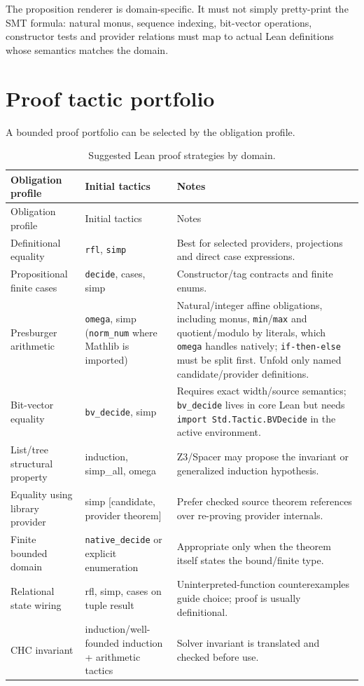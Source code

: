 \documentclass[11pt,oneside]{report}
\newcommand{\code}[1]{\texttt{#1}}
\begin{document}
The proposition renderer is domain-specific. It must not simply pretty-print the SMT formula: natural monus, sequence indexing, bit-vector operations, constructor tests and provider relations must map to actual Lean definitions whose semantics matches the domain.

\section{Proof tactic portfolio}

A bounded proof portfolio can be selected by the obligation profile.

\begin{longtable}{@{}L{0.24\textwidth}L{0.28\textwidth}L{0.39\textwidth}@{}}
\caption{Suggested Lean proof strategies by domain.}\label{tab:proof-tactics}\\
\toprule
Obligation profile & Initial tactics & Notes \\
\midrule
\endfirsthead
\toprule
Obligation profile & Initial tactics & Notes \\
\midrule
\endhead
\bottomrule
\endfoot
Definitional equality & \code{rfl}, \code{simp} & Best for selected providers, projections and direct case expressions. \\
Propositional finite cases & \code{decide}, cases, simp & Constructor/tag contracts and finite enums. \\
Presburger arithmetic & \code{omega}, simp (\code{norm\_num} where Mathlib is imported) & Natural/integer affine obligations, including monus, \code{min}/\code{max} and quotient/modulo by literals, which \code{omega} handles natively; \code{if-then-else} must be split first. Unfold only named candidate/provider definitions. \\
Bit-vector equality & \code{bv\_decide}, simp & Requires exact width/source semantics; \code{bv\_decide} lives in core Lean but needs \code{import Std.Tactic.BVDecide} in the active environment. \\
List/tree structural property & induction, simp\_all, omega & Z3/Spacer may propose the invariant or generalized induction hypothesis. \\
Equality using library provider & simp [candidate, provider theorem] & Prefer checked source theorem references over re-proving provider internals. \\
Finite bounded domain & \code{native\_decide} or explicit enumeration & Appropriate only when the theorem itself states the bound/finite type. \\
Relational state wiring & rfl, simp, cases on tuple result & Uninterpreted-function counterexamples guide choice; proof is usually definitional. \\
CHC invariant & induction/well-founded induction + arithmetic tactics & Solver invariant is translated and checked before use. \\
\end{longtable}
\end{document}
